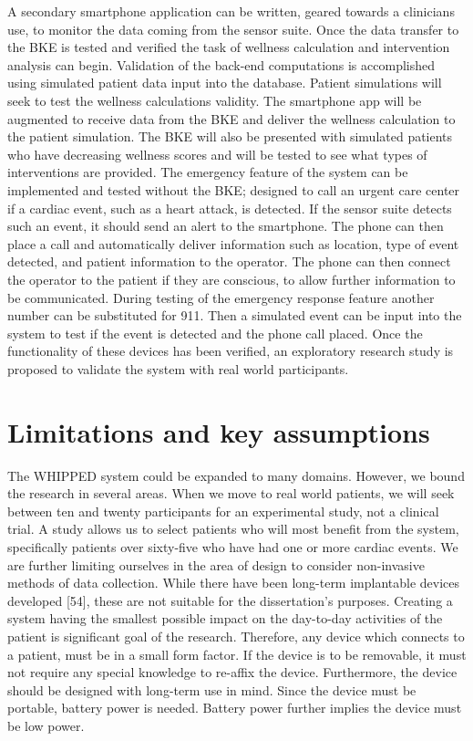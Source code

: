 A secondary smartphone application can be written, geared towards a clinicians use, to monitor the data coming from the sensor suite. Once the data transfer to the BKE is tested and verified the task of wellness calculation and intervention analysis can begin. Validation of the back-end computations is accomplished using simulated patient data input into the database. Patient simulations will seek to test the wellness calculations validity. The smartphone app will be augmented to receive data from the BKE and deliver the wellness calculation to the patient simulation. The BKE will also be presented with simulated patients who have decreasing wellness scores and will be tested to see what types of interventions are provided. The emergency feature of the system can be implemented and tested without the BKE; designed to call an urgent care center if a cardiac event, such as a heart attack, is detected. If the sensor suite detects such an event, it should send an alert to the smartphone. The phone can then place a call and automatically deliver information such as location, type of event detected, and patient information to the operator. The phone can then connect the operator to the patient if they are conscious, to allow further information to be communicated. During testing of the emergency response feature another number can be substituted for 911. Then a simulated event can be input into the system to test if the event is detected and the phone call placed. Once the functionality of these devices has been verified, an exploratory research study is proposed to validate the system with real world participants.

\section{Limitations and key assumptions}
\label{sec:LimitationsAndKeyAssumptions}
The WHIPPED system could be expanded to many domains. However, we bound the research in several areas. When we move to real world patients, we will seek between ten and twenty participants for an experimental study, not a clinical trial. A study allows us to select patients who will most benefit from the system, specifically patients over sixty-five who have had one or more cardiac events. We are further limiting ourselves in the area of design to consider non-invasive methods of data collection. While there have been long-term implantable devices developed [54], these are not suitable for the dissertation's purposes. Creating a system having the smallest possible impact on the day-to-day activities of the patient is significant goal of the research. Therefore, any device which connects to a patient, must be in a small form factor. If the device is to be removable, it must not require any special knowledge to re-affix the device.  Furthermore, the device should be designed with long-term use in mind. Since the device must be portable, battery power is needed. Battery power further implies the device must be low power.

